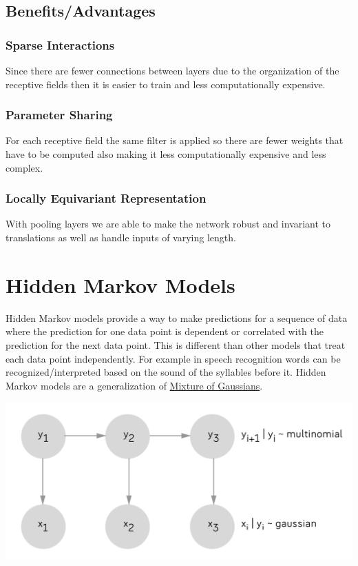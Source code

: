 \documentclass[12pt]{article}
\begin{document}
    \subsection{Benefits/Advantages}
        \subsubsection{Sparse Interactions}
            Since there are fewer connections between layers due to the organization of the receptive fields then it is
            easier to train and less computationally expensive.
        
        \subsubsection{Parameter Sharing}
            For each receptive field the same filter is applied so there are fewer weights that have to be computed also
            making it less computationally expensive and less complex.
        
        \subsubsection{Locally Equivariant Representation}
            With pooling layers we are able to make the network robust and invariant to translations as well as handle
            inputs of varying length.

\section{Hidden Markov Models}
    Hidden Markov models provide a way to make predictions for a sequence of data where the prediction for one data
    point is dependent or correlated with the prediction for the next data point. This is different than other models
    that treat each data point independently. For example in speech recognition words can be recognized/interpreted based on the
    sound of the syllables before it. Hidden Markov models are a generalization of
    \hyperref[sec:MixtureOfGaussian]{Mixture of Gaussians}.

    \begin{center}
        \includegraphics[scale=0.3]{HMM}
    \end{center}
\end{document}
